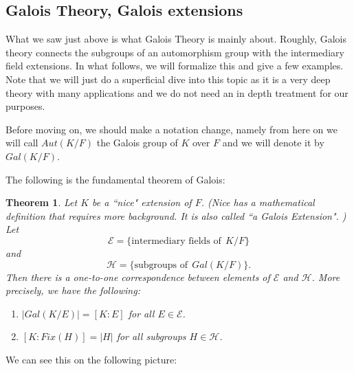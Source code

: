 \documentclass[12pt]{article}
\theoremstyle{plain}
\newtheorem{theorem}{Theorem}
\theoremstyle{definition}
\theoremstyle{remark}
\begin{document}
\subsection{Galois Theory, Galois extensions}
What we saw just above is what Galois Theory is mainly about. Roughly, Galois theory connects the subgroups of an automorphism group with the intermediary field extensions.
In what follows, we will formalize this and give a few examples. Note that we will just do a superficial dive into this topic as it is a very deep theory with many applications and we do not need an in depth treatment for our purposes.

Before moving on, we should make a notation change, namely from here on we will call $Aut(K/F)$ the Galois group of $K$ over $F$ and we will denote it by $Gal(K/F)$.

The following is the fundamental theorem of Galois:
\begin{theorem}
Let $K$ be a ``nice" extension of $F$. (Nice has a mathematical definition that requires more background. It is also called ``a Galois Extension". ) Let
$$\mathcal{E} = \{\textrm{intermediary fields of} \:\: K/F\}$$
and
$$\mathcal{H} = \{\textrm{subgroups of} \:\: Gal(K/F)\}.$$
Then there is a one-to-one correspondence between elements of $\mathcal{E}$ and $\mathcal{H}$. More precisely, we have the following:
\begin{enumerate}
    \item $|Gal(K/E)| = [K:E]$ for all $E\in \mathcal{E}$.
    \item $[K:Fix(H)]=|H|$ for all subgroups $H\in \mathcal{H}$.
\end{enumerate}
\end{theorem}

We can see this on the following picture:

\end{document}
